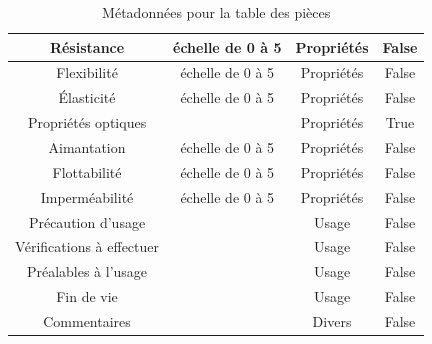 \documentclass[12pt,a4paper]{article}
\begin{document}
\begin{table}
\begin{center}
\begin{tabular}{|c|c|c|c|}
                Résistance & échelle de 0 à 5 & Propriétés & False \\
                \hline
                Flexibilité & échelle de 0 à 5 & Propriétés & False \\
                \hline
                Élasticité & échelle de 0 à 5 & Propriétés & False \\
                \hline
                Propriétés optiques &   & Propriétés & True \\
                \hline
                Aimantation & échelle de 0 à 5 & Propriétés & False \\
                \hline
                Flottabilité & échelle de 0 à 5 & Propriétés & False \\
                \hline
                Imperméabilité & échelle de 0 à 5 & Propriétés & False \\
                \hline
                Précaution d'usage &   & Usage & False \\
                \hline
                Vérifications à effectuer &   & Usage & False \\
                \hline
                Préalables à l'usage &   & Usage & False \\
                \hline
                Fin de vie &   & Usage & False \\
                \hline
                Commentaires &   & Divers & False \\
                \hline
            \end{tabular}
        \end{center}
        \caption{Métadonnées pour la table des pièces}
    \end{table}
            
    
\end{document}
